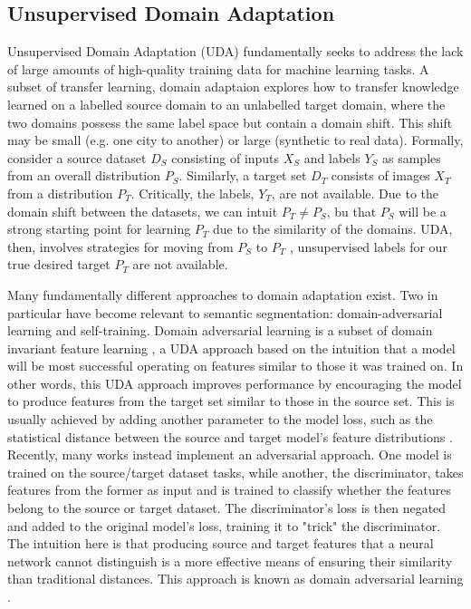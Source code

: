 \documentclass[a4paper,12pt]{report}
\begin{document}
\subsection{Unsupervised Domain Adaptation}
Unsupervised Domain Adaptation (UDA) fundamentally seeks to address the lack of large amounts of high-quality training data for machine learning tasks. A subset of transfer learning, domain adaptaion explores how to transfer knowledge learned on a labelled source domain to an unlabelled target domain, where the two domains possess the same label space but contain a domain shift. This shift may be small (e.g. one city to another) or large (synthetic to real data). Formally, consider a source dataset $D_S$ consisting of inputs $X_S$ and labels $Y_S$ as samples from an overall distribution $P_S$. Similarly, a target set $D_T$ consists of images $X_T$ from a distribution $P_T$. Critically, the labels, $Y_T$, are not available. Due to the domain shift between the datasets, we can intuit $P_T \neq P_S$, bu that  $P_S$ will be a strong starting point for learning $P_T$ due to the similarity of the domains. UDA, then, involves strategies for moving from $P_S$ to $P_T$ \cite{wilson_survey_2020}, unsupervised labels for our true desired target $P_T$ are not available.

Many fundamentally different approaches to domain adaptation exist. Two in particular have become relevant to semantic segmentation: domain-adversarial learning and self-training. Domain adversarial learning is a subset of domain invariant feature learning \cite{wilson_survey_2020}, a UDA approach based on the intuition that a model will be most successful operating on features similar to those it was trained on. In other words, this UDA approach improves performance by encouraging the model to produce features from the target set similar to those in the source set. This is usually achieved by adding another parameter to the model loss, such as the statistical distance between the source and target model's feature distributions \cite{gretton_kernel_2006} \cite{sun_return_2015}. Recently, many works \cite{ganin_unsupervised_2015} \cite{ganin_domain-adversarial_2016} instead implement an adversarial \cite{goodfellow_generative_2014} approach. One model is trained on the source/target dataset tasks, while another, the discriminator, takes features from the former as input and is trained to classify whether the features belong to the source or target dataset. The discriminator's loss is then negated and added to the original model's loss, training it to "trick" the discriminator. The intuition here is that producing source and target features that a neural network cannot distinguish is a more effective means of ensuring their similarity than traditional distances. This approach is known as domain adversarial learning \cite{ganin_domain-adversarial_2016}.
\end{document}
